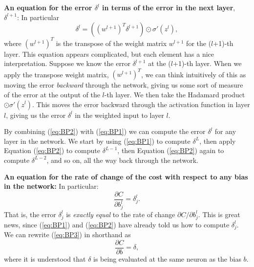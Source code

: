 \documentclass[a4paper,twoside,10pt]{book}
\begin{document}
\textbf{An equation for the error $\delta^l$ in terms of the error in the next layer}, $\delta^{l+1}$: In particular
\begin{equation}
	\delta^l = ((w^{l+1})^T \delta^{l+1}) \odot \sigma'(z^l),
	\tag{BP2}
	\label{eq:BP2}
\end{equation}
where $(w^{l+1})^T$ is the transpose of the weight matrix $w^{l+1}$ for the ($l$+1)-th layer. This equation appears complicated, but each element has a nice interpretation. Suppose we know the error $\delta^{l+1}$ at the ($l$+1)-th layer. When we apply the transpose weight matrix, $(w^{l+1})^T$, we can think intuitively of this as moving the error \textit{backward} through the network, giving us some sort of measure of the error at the output of the $l$-th layer. We then take the Hadamard product $\odot \sigma'(z^l)$. This moves the error backward through the activation function in layer $l$, giving us the error $\delta^l$ in the weighted input to layer $l$.

By combining (\ref{eq:BP2}) with (\ref{eq:BP1}) we can compute the error $\delta^l$ for any layer in the network. We start by using (\ref{eq:BP1}) to compute $\delta^L$, then apply Equation (\ref{eq:BP2}) to compute $\delta^{L-1}$, then Equation (\ref{eq:BP2}) again to compute $\delta^{L-2}$, and so on, all the way back through the network.

\textbf{An equation for the rate of change of the cost with respect to any bias in the network:} In particular:
\begin{equation}
\frac{\partial C}{\partial b^l_j} = \delta^l_j.
\tag{BP3}
\label{eq:BP3}
\end{equation}
That is, the error $\delta^l_j$ is \textit{exactly equal} to the rate of change $\partial{}C/\partial{}b^l_j$. This is great news, since (\ref{eq:BP1}) and (\ref{eq:BP2}) have already told us how to compute $\delta^l_j$. We can rewrite (\ref{eq:BP3}) in shorthand as
\begin{equation}
\frac{\partial C}{\partial b} = \delta,\label{eq:31}
\end{equation}
where it is understood that $\delta$ is being evaluated at the same neuron as the bias $b$.
\end{document}
